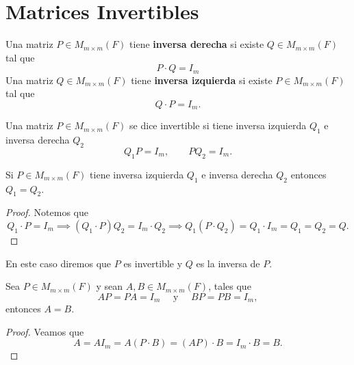 \documentclass[12pt,a4paper]{book}
\begin{document}
    \section{Matrices Invertibles}

    \begin{definicion}
        Una matriz $P\in M_{m\times m}(F)$ tiene \textbf{inversa derecha} si existe $Q\in M_{m\times m}(F)$ tal que
        \begin{equation*}
            P\cdot Q=I_{m}
        \end{equation*}
        Una matriz $Q\in M_{m\times m}(F)$ tiene \textbf{inversa izquierda} si existe $P\in M_{m\times m}(F)$
        tal que
        \begin{equation*}
            Q\cdot P=I_{m}.
        \end{equation*}
    \end{definicion}

    Una matriz $P\in M_{m\times m}(F)$ se dice invertible si tiene inversa izquierda $Q_{1}$ e
    inversa derecha $Q_{2}$
    \begin{equation*}
        Q_{1}P=I_{m},\qquad PQ_{2}=I_{m}.
    \end{equation*}

    \begin{proposicion}
        Si $P\in M_{m\times m}(F)$ tiene inversa izquierda $Q_{1}$ e inversa derecha $Q_{2}$ entonces
        $Q_{1}=Q_{2}$.
    \end{proposicion}

    \begin{proof}
        Notemos que
        \[
        Q_{1}\cdot P=I_{m}\implies(Q_{1}\cdot P)Q_{2}=I_{m}\cdot Q_{2}\implies Q_{1}(P\cdot Q_{2})=Q_{1}\cdot I_{m}=Q_{1}=Q_{2}=Q.
        \]
    \end{proof}
    En este caso diremos que $P$ es invertible y $Q$ es la inversa de $P$.

    \begin{proposicion}
        Sea $P\in M_{m\times m}(F)$ y sean $A,B\in M_{m\times m}(F)$, tales que
        \begin{equation*}
            AP=PA=I_{m}\quad\text{ y }\quad BP=PB=I_{m},
        \end{equation*}
        entonces $A=B$.
    \end{proposicion}

    \begin{proof}
        Veamos que
        \[
        A=AI_{m}=A(P\cdot B)=(AP)\cdot B= I_{m}\cdot B=B.
        \]
    \end{proof}
\end{document}
